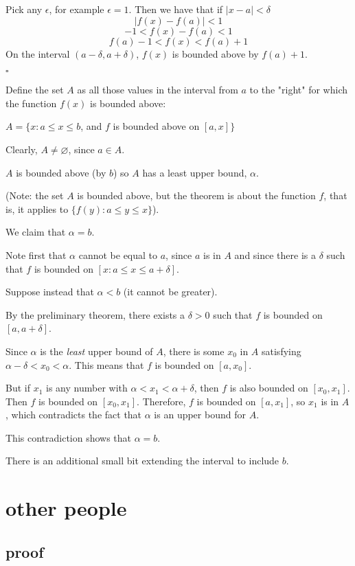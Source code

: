 \documentclass[11pt, oneside]{article}
\begin{document}
Pick any $\epsilon$, for example $\epsilon = 1$.  Then we have that if $|x - a| < \delta$
\[  |f(x) - f(a)| < 1 \]
\[ - 1 < f(x) - f(a) < 1 \]
\[ f(a) - 1 < f(x) <  f(a) + 1 \]
On the interval $(a - \delta, a + \delta)$, $f(x)$ is bounded above by $f(a) + 1$.

$\square$

Define the set $A$ as all those values in the interval from $a$ to the "right" for which the function $f(x)$ is bounded above:

$A = \{ x: a \le x \le b$, and $f$ is bounded above on $[a,x]\}$

Clearly, $A \ne \varnothing$, since $a \in A$.

$A$ is bounded above (by $b$) so $A$ has a least upper bound, $\alpha$.

(Note:  the set $A$ is bounded above, but the theorem is about the function $f$, that is, it applies to $\{ f(y) : a \le y \le x \} $).

We claim that $\alpha = b$.

Note first that $\alpha$ cannot be equal to $a$, since $a$ is in $A$ and since there is a $\delta$ such that $f$ is bounded on $[x: a \le x \le a + \delta]$.

Suppose instead that $\alpha < b$ (it cannot be greater).

By the preliminary theorem, there exists a $\delta > 0$ such that $f$ is bounded on $[a, a + \delta]$.

Since $\alpha$ is the \emph{least} upper bound of $A$, there is some $x_0$ in $A$ satisfying $\alpha - \delta < x_0 < \alpha$.  This means that $f$ is bounded on $[a,x_0]$.

But if $x_1$ is any number with $\alpha < x_1 < \alpha + \delta$, then $f$ is also bounded on $[x_0,x_1]$.  Then $f$ is bounded on $[x_0,x_1]$.  Therefore, $f$ is bounded on $[a, x_1]$, so $x_1$ is in $A$, which contradicts the fact that $\alpha$ is an upper bound for $A$.

This contradiction shows that $\alpha = b$.

There is an additional small bit extending the interval to include $b$.

\section{other people}

\subsection*{proof}
\end{document}
